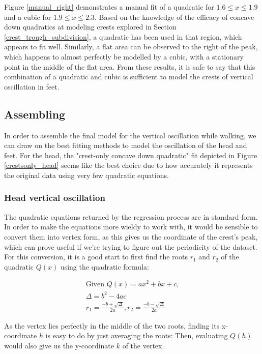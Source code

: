 \documentclass[12pt, a4paper]{article}
\begin{document}
Figure \ref{manual_right} demonstrates a manual fit of a quadratic for $1.6 \le
    x \le 1.9$ and a cubic for $1.9 \le x \le 2.3$. Based on the knowledge of the
efficacy of concave down quadratics at modeling crests explored in Section
\ref{crest_trough_subdivision}, a quadratic has been used in that region, which
appears to fit well. Similarly, a flat area can be observed to the right of the
peak, which happens to almost perfectly be modelled by a cubic, with a
stationary point in the middle of the flat area. From these results, it is safe
to say that this combination of a quadratic and cubic is sufficient to model the
crests of vertical oscillation in feet.

\subsection{Assembling}
In order to assemble the final model for the vertical oscillation while walking,
we can draw on the best fitting methods to model the oscillation of the head and
feet. For the head, the "crest-only concave down quadratic" fit depicted in
Figure \ref{crestsonly_head} seems like the best choice due to how accurately it
represents the original data using very few quadratic equations. \\

\subsubsection{Head vertical oscillation}
The quadratic equations returned by the regression process are in standard form.
In order to make the equations more wieldy to work with, it would be sensible to
convert them into vertex form, as this gives us the coordinate of the crest's
peak, which can prove useful if we're trying to figure out the periodicity of
the dataset. \\

For this conversion, it is a good start to first find the roots $r_1$ and $r_2$
of the quadratic $Q(x)$ using the quadratic formula:


\begin{align*}
    \text{Given $Q(x) = ax^2 + bx + c$,} \\
    \Delta = b^2 - 4ac                   \\
    r_1    = \frac{-b + \sqrt{\Delta}}{2a},
    r_2    = \frac{-b - \sqrt{\Delta}}{2a}
\end{align*}

As the vertex lies perfectly in the middle of the two roots, finding its
x-coordinate $h$ is easy to do by just averaging the roots:
Then, evaluating $Q(h)$ would also give us the y-coordinate $k$ of the vertex.
\end{document}
